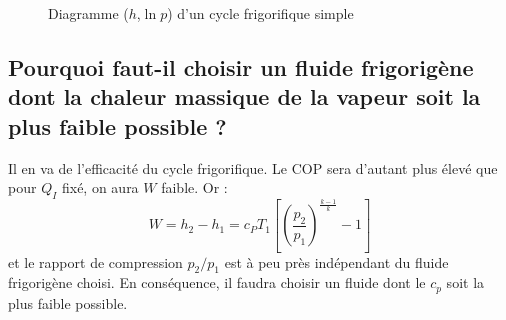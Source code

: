 \begin{figure}[p]\centering
    \caption{Diagramme ($h$,$\ln p$) d'un cycle frigorifique simple}
    \label{fig:diag_h_lnp}
\end{figure}

\subsection{Pourquoi faut-il choisir un fluide frigorigène dont la chaleur massique de la vapeur soit la plus faible possible ?}
Il en va de l'efficacité du cycle frigorifique. Le COP sera d'autant plus élevé que pour $Q_I$ fixé, on aura $W$ faible. Or :
\begin{equation} W = h_2-h_1 = c_PT_1\left[\left(\frac{p_2}{p_1}\right)^{\frac{k-1}{k}}-1\right] \end{equation}
et le rapport de compression $p_2/p_1$ est à peu près indépendant du fluide frigorigène choisi. En conséquence, il faudra choisir un fluide dont le $c_p$ soit la plus faible possible. 

